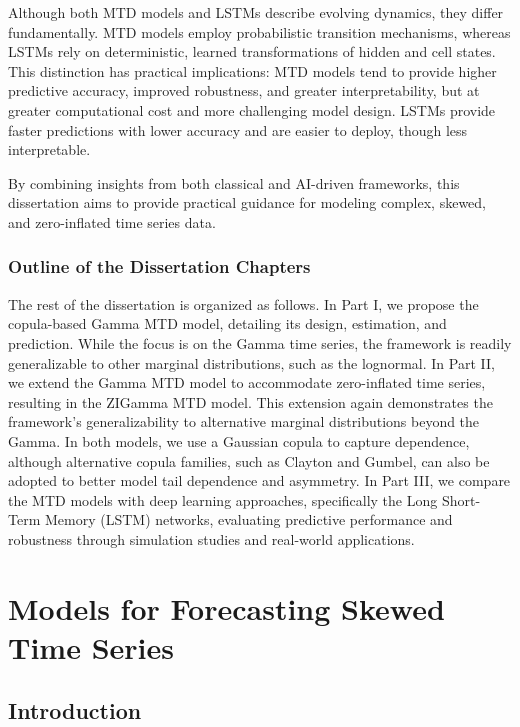 \documentclass[
  letterpaper,
  double,
  12pt,
  1.0in]{beavtex}
\begin{document}
Although both MTD models and LSTMs describe evolving dynamics, they
differ fundamentally. MTD models employ probabilistic transition
mechanisms, whereas LSTMs rely on deterministic, learned transformations
of hidden and cell states. This distinction has practical implications:
MTD models tend to provide higher predictive accuracy, improved
robustness, and greater interpretability, but at greater computational
cost and more challenging model design. LSTMs provide faster predictions
with lower accuracy and are easier to deploy, though less interpretable.

By combining insights from both classical and AI-driven frameworks, this
dissertation aims to provide practical guidance for modeling complex,
skewed, and zero-inflated time series data.

\section{Outline of the Dissertation
Chapters}\label{outline-of-the-dissertation-chapters}

The rest of the dissertation is organized as follows. In Part I, we
propose the copula-based Gamma MTD model, detailing its design,
estimation, and prediction. While the focus is on the Gamma time series,
the framework is readily generalizable to other marginal distributions,
such as the lognormal. In Part II, we extend the Gamma MTD model to
accommodate zero-inflated time series, resulting in the ZIGamma MTD
model. This extension again demonstrates the framework's
generalizability to alternative marginal distributions beyond the Gamma.
In both models, we use a Gaussian copula to capture dependence, although
alternative copula families, such as Clayton and Gumbel, can also be
adopted to better model tail dependence and asymmetry. In Part III, we
compare the MTD models with deep learning approaches, specifically the
Long Short-Term Memory (LSTM) networks, evaluating predictive
performance and robustness through simulation studies and real-world
applications.

\part{Models for Forecasting Skewed Time Series}

\chapter{Introduction}\label{sec-ch1-intro}
\end{document}
